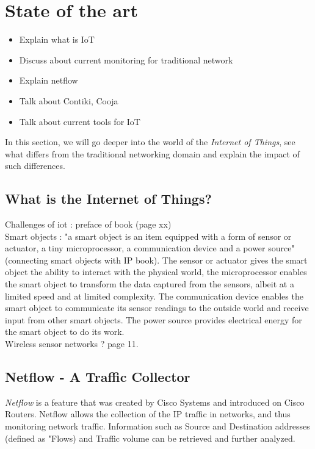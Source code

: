 \chapter{State of the art} \label{ch:state_art}

\begin{itemize}
	\item Explain what is IoT
	\item Discuss about current monitoring for traditional network
	\item Explain netflow
	\item Talk about Contiki, Cooja
	\item Talk about current tools for IoT
\end{itemize}

In this section, we will go deeper into the world of the \textit{Internet of Things}, see what differs from the traditional networking domain and explain the impact of such differences. \\

\section{What is the Internet of Things?}
Challenges of iot : preface of book (page xx)\\

Smart objects : "a smart object is an item equipped with a form of sensor or actuator, a tiny microprocessor, a communication device and a power source"(connecting smart objects with IP book). The sensor or actuator gives the smart object the ability to interact with the physical world, the microprocessor enables the smart object to transform the data captured from the sensors, albeit at a limited speed and at limited complexity. The communication device enables the smart object to communicate its sensor readings to the outside world and receive input from other smart objects. The power source provides electrical energy for the smart object to do its work. \\

Wireless sensor networks ? page 11. 

\section{Netflow - A Traffic Collector}
\textit{Netflow} is a feature that was created by Cisco Systems and introduced on Cisco Routers. Netflow allows the collection of the IP traffic in networks, and thus monitoring network traffic. Information such as Source and Destination addresses (defined as "Flows) and Traffic volume can be retrieved and further analyzed.\\

